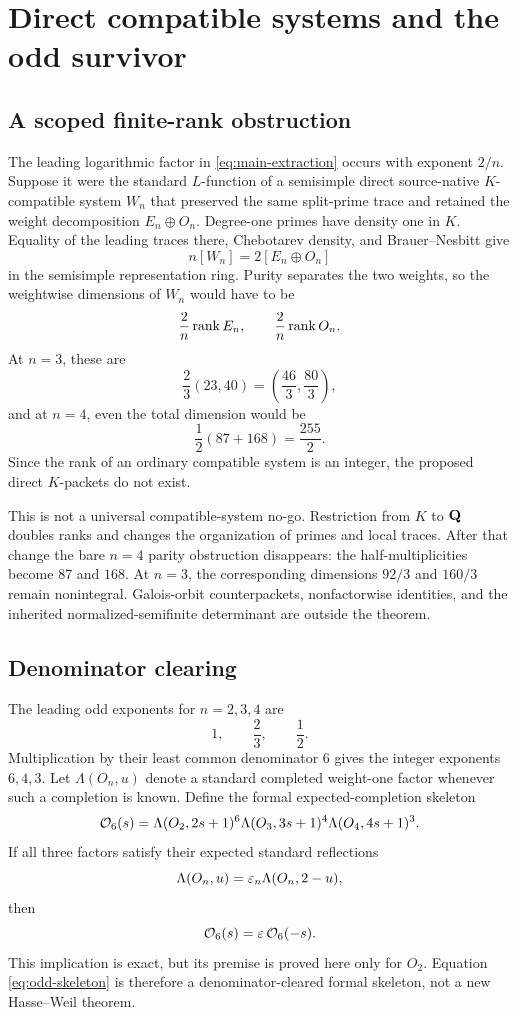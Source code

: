 \section{Direct compatible systems and the odd survivor}
\label{sec:compatible}

\subsection{A scoped finite-rank obstruction}

The leading logarithmic factor in \eqref{eq:main-extraction} occurs with
exponent \(2/n\).  Suppose it were the standard \(L\)-function of a
semisimple direct source-native \(K\)-compatible system \(W_n\) that
preserved the same split-prime trace and retained the weight decomposition
\(E_n\oplus O_n\).  Degree-one primes have density one in \(K\).  Equality
of the leading traces there, Chebotarev density, and Brauer--Nesbitt give
\cite{Serre1981}
\[
 n[W_n]=2[E_n\oplus O_n]
\]
in the semisimple representation ring.  Purity separates the two weights,
so the weightwise dimensions of \(W_n\) would have to be
\[
 \frac2n\operatorname{rank} E_n,\qquad \frac2n\operatorname{rank} O_n.
\]
At \(n=3\), these are
\[
 \frac23(23,40)=\left(\frac{46}{3},\frac{80}{3}\right),
\]
and at \(n=4\), even the total dimension would be
\[
 \frac12(87+168)=\frac{255}{2}.
\]
Since the rank of an ordinary compatible system is an integer, the proposed
direct \(K\)-packets do not exist.

\begin{remark}
This is not a universal compatible-system no-go.  Restriction from \(K\)
to \(\mathbf Q\) doubles ranks and changes the organization of primes and local
traces.  After that change the bare \(n=4\) parity obstruction disappears:
the half-multiplicities become \(87\) and \(168\).  At \(n=3\), the
corresponding dimensions \(92/3\) and \(160/3\) remain nonintegral.
Galois-orbit counterpackets, nonfactorwise identities, and the inherited
normalized-semifinite determinant are outside the theorem.
\end{remark}

\subsection{Denominator clearing}

The leading odd exponents for \(n=2,3,4\) are
\[
 1,\qquad \frac23,\qquad \frac12.
\]
Multiplication by their least common denominator \(6\) gives the integer
exponents \(6,4,3\).  Let \(\Lambda(O_n,u)\) denote a standard completed
weight-one factor whenever such a completion is known.  Define the formal
expected-completion skeleton
\begin{equation}\label{eq:odd-skeleton}
 \mathcal O_6(s)=
 \Lambda(O_2,2s+1)^6
 \Lambda(O_3,3s+1)^4
 \Lambda(O_4,4s+1)^3.
\end{equation}
If all three factors satisfy their expected standard reflections
\[
 \Lambda(O_n,u)=\varepsilon_n\Lambda(O_n,2-u),
\]
then
\[
 \mathcal O_6(s)=\varepsilon\,\mathcal O_6(-s).
\]
This implication is exact, but its premise is proved here only for
\(O_2\).  Equation \eqref{eq:odd-skeleton} is therefore a
denominator-cleared formal skeleton, not a new Hasse--Weil theorem.

